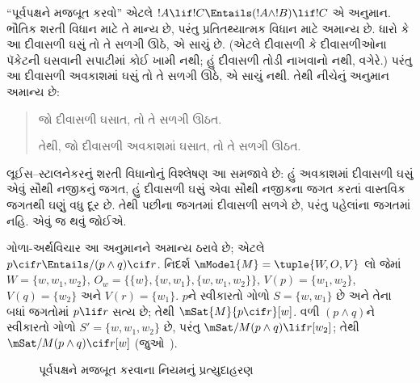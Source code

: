 \documentclass[../../../include/open-logic-section]{subfiles}
\begin{document}


``પૂર્વપક્ષને મજબૂત કરવો'' એટલે
$!A \lif !C \Entails (!A \land !B) \lif !C$ એ અનુમાન.
ભૌતિક શરતી વિધાન માટે તે માન્ય છે, પરંતુ પ્રતિતથ્યાત્મક વિધાન માટે
અમાન્ય છે. ધારો કે આ દીવાસળી ઘસું તો તે સળગી ઊઠે, એ સાચું છે.
(એટલે દીવાસળી કે દીવાસળીઓના પૅકેટની ઘસવાની સપાટીમાં કોઈ ખામી નથી;
હું દીવાસળી તોડી નાખવાનો નથી, વગેરે.) પરંતુ આ દીવાસળી અવકાશમાં
ઘસું તો તે સળગી ઊઠે, એ સાચું નથી. તેથી નીચેનું અનુમાન અમાન્ય છે:
\begin{quote}
  જો દીવાસળી ઘસાત, તો તે સળગી ઊઠત.

  તેથી, જો દીવાસળી અવકાશમાં ઘસાત, તો તે સળગી ઊઠત.
\end{quote}

લૂઈસ--સ્ટાલનેકરનું શરતી વિધાનોનું વિશ્લેષણ આ સમજાવે છે: હું
અવકાશમાં દીવાસળી ઘસું એવું સૌથી નજીકનું જગત, હું દીવાસળી ઘસું
એવા સૌથી નજીકના જગત કરતાં વાસ્તવિક જગતથી ઘણું વધુ દૂર છે. તેથી
પછીના જગતમાં દીવાસળી સળગે છે, પરંતુ પહેલાંના જગતમાં નહિ. એવું જ
થવું જોઈએ.

\begin{ex}
  ગોળા-અર્થવિચાર આ અનુમાનને અમાન્ય ઠરાવે છે; એટલે $p
  \cif r \Entails/ (p \land q) \cif r$. નિદર્શ $\mModel{M}
  = \tuple{W, O, V}$ લો જેમાં $W = \{w, w_1, w_2\}$,
  $O_w = \{\{w\}, \{w, w_1\}, \{w, w_1, w_2\}\}$,
  $V(p) = \{w_1, w_2\}$, $V(q) = \{w_2\}$ અને
  $V(r) = \{w_1\}$. $p$ને સ્વીકારતો ગોળો $S = \{w,
  w_1\}$ છે અને તેના બધાં જગતોમાં $p \lif r$ સત્ય છે; તેથી
  $\mSat{M}{p \cif r}[w]$. વળી $(p \land q)$ને સ્વીકારતો ગોળો
  $S' = \{w, w_1, w_2\}$ છે, પરંતુ
  $\mSat/{M}{(p \land q) \lif r}[w_2]$; તેથી
  $\mSat/{M}{(p \land q) \cif r}[w]$ (જુઓ~).

\begin{figure}
\begin{center}
\caption{પૂર્વપક્ષને મજબૂત કરવાના નિયમનું પ્રત્યુદાહરણ}
\end{center}
\end{figure}
\end{ex}
\end{document}
